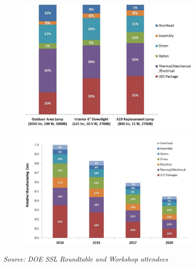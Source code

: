 \begin{figure}[!h]
\centering
\begin{subfigure}[t]{.45\textwidth}
    \centering
    \includegraphics[width=\textwidth]{./0_intro/img/cost_breakdown.png}
    \caption{}
    \label{fig:cost_breakdown}
\end{subfigure}
\begin{subfigure}[t]{.45\textwidth}
   \centering
   \includegraphics[width=\textwidth]{./0_intro/img/cost_breakdown_forecast.png}
   \caption{}
   \label{fig:cost_breakdown_forecast}
\end{subfigure}
\caption{\emph{Source: DOE SSL Roundtable and Workshop attendees}}
\label{fig:costs_BD_FC}
\end{figure}



